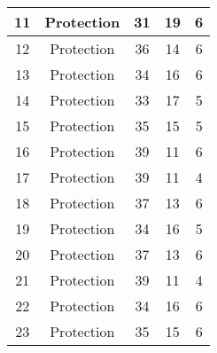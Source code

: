 \documentclass[results.tex]{subfiles}
\begin{document}
\begin{center}
\begin{tabular}{| c || c | c | c | c |}
            \hline
            11                      & Protection                   & 31                     & 19                      & 6                    \\
            \hline
            12                      & Protection                   & 36                     & 14                      & 6                    \\
            \hline
            13                      & Protection                   & 34                     & 16                      & 6                    \\
            \hline
            14                      & Protection                   & 33                     & 17                      & 5                    \\
            \hline
            15                      & Protection                   & 35                     & 15                      & 5                    \\
            \hline
            16                      & Protection                   & 39                     & 11                      & 6                    \\
            \hline
            17                      & Protection                   & 39                     & 11                      & 4                    \\
            \hline
            18                      & Protection                   & 37                     & 13                      & 6                    \\
            \hline
            19                      & Protection                   & 34                     & 16                      & 5                    \\
            \hline
            20                      & Protection                   & 37                     & 13                      & 6                    \\
            \hline
            21                      & Protection                   & 39                     & 11                      & 4                    \\
            \hline
            22                      & Protection                   & 34                     & 16                      & 6                    \\
            \hline
            23                      & Protection                   & 35                     & 15                      & 6                    \\

\end{tabular}
\end{center}
\end{document}

